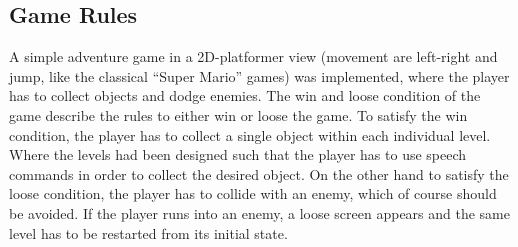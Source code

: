 \subsection{Game Rules}\label{sec:game_design_rules}
A simple adventure game in a 2D-platformer view (movement are left-right and jump, like the classical \enquote{Super Mario} games) was implemented, where the player has to collect objects and dodge enemies.
The win and loose condition of the game describe the rules to either win or loose the game.
To satisfy the win condition, the player has to collect a single object within each individual level.
Where the levels had been designed such that the player has to use speech commands in order to collect the desired object.
On the other hand to satisfy the loose condition, the player has to collide with an enemy, which of course should be avoided.
If the player runs into an enemy, a loose screen appears and the same level has to be restarted from its initial state.



